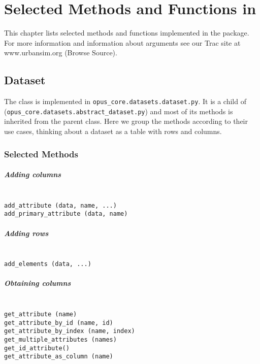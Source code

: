 
\chapter{Selected Methods and Functions in }
\label{appendix:selected-methods}
%
This chapter lists selected methods and functions implemented in the  package.
For more information and information about arguments see our Trac site at www.urbansim.org (Browse Source).

%
\section{Dataset}
%
\label{appendix:selected-methods-dataset}
%
The class  is implemented in
\verb|opus_core.datasets.dataset.py|. 
It is a child of  (\verb|opus_core.datasets.abstract_dataset.py|)
and most of its methods is inherited from the parent class. Here we group the methods 
according to their use cases, thinking about a dataset as a table with rows and columns.

%
\subsection{Selected Methods}
%
\paragraph{Adding columns}~\\[1mm]
{\tt add\_attribute (data, name, ...)}\\
{\tt add\_primary\_attribute (data, name)}

\paragraph{Adding rows}~\\[1mm]
{\tt add\_elements (data, ...)}

\paragraph{Obtaining columns}~\\[1mm]
{\tt get\_attribute (name)} \\
{\tt get\_attribute\_by\_id (name, id)} \\
{\tt get\_attribute\_by\_index (name, index)}\\
{\tt get\_multiple\_attributes (names)} \\
{\tt get\_id\_attribute()} \\
{\tt get\_attribute\_as\_column (name)}

